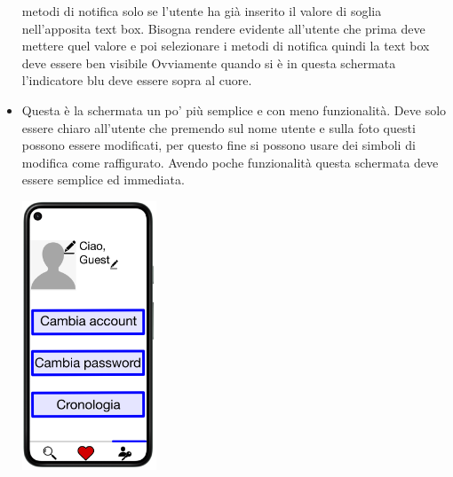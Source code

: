 \documentclass{article}
\begin{document}
\begin{itemize}
                metodi di notifica solo se l'utente ha già inserito il valore di soglia nell'apposita text box. Bisogna rendere evidente
                all'utente che prima deve mettere quel valore e poi selezionare i metodi di notifica quindi la text box deve essere ben
                visibile Ovviamente quando si è in questa schermata l’indicatore  blu deve essere sopra al cuore.
        \item Questa è la schermata un po’ più semplice e con meno funzionalità. Deve solo  essere chiaro all’utente che premendo sul nome
                utente e sulla foto questi  possono essere modificati, per questo fine si possono usare dei simboli di  modifica come
                raffigurato. Avendo poche funzionalità questa schermata deve  essere semplice ed immediata.
        \begin{center}
                \includegraphics[width=40mm,scale=0.5]{area personale.PNG}
        \end{center}
\end{itemize}
\end{document}
